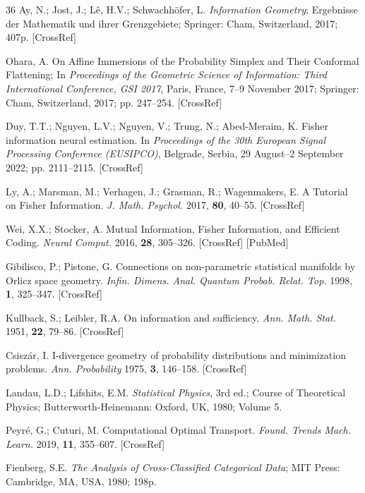 \documentclass[12pt]{article}
\begin{document}
\begin{thebibliography}{36}
Ay, N.; Jost, J.; L\^e, H.V.; Schwachhöfer, L. \textit{Information Geometry};
Ergebnisse der Mathematik und ihrer Grenzgebiete; Springer: Cham, Switzerland, 2017; 407p.
[CrossRef]

Ohara, A. On Affine Immersions of the Probability Simplex and Their Conformal Flattening;
In \textit{Proceedings of the Geometric Science of Information: Third International Conference, GSI 2017},
Paris, France, 7--9 November 2017; Springer: Cham, Switzerland, 2017; pp. 247--254. [CrossRef]

Duy, T.T.; Nguyen, L.V.; Nguyen, V.; Trung, N.; Abed-Meraim, K. Fisher information neural estimation.
In \textit{Proceedings of the 30th European Signal Processing Conference (EUSIPCO)},
Belgrade, Serbia, 29 August--2 September 2022; pp. 2111--2115. [CrossRef]

Ly, A.; Marsman, M.; Verhagen, J.; Grasman, R.; Wagenmakers, E. A Tutorial on Fisher Information.
\textit{J. Math. Psychol.} 2017, \textbf{80}, 40--55. [CrossRef]

Wei, X.X.; Stocker, A. Mutual Information, Fisher Information, and Efficient Coding.
\textit{Neural Comput.} 2016, \textbf{28}, 305--326. [CrossRef] [PubMed]

Gibilisco, P.; Pistone, G. Connections on non-parametric statistical manifolds by Orlicz space geometry.
\textit{Infin. Dimens. Anal. Quantum Probab. Relat. Top.} 1998, \textbf{1}, 325--347. [CrossRef]

Kullback, S.; Leibler, R.A. On information and sufficiency.
\textit{Ann. Math. Stat.} 1951, \textbf{22}, 79--86. [CrossRef]

Csiszár, I. I-divergence geometry of probability distributions and minimization problems.
\textit{Ann. Probability} 1975, \textbf{3}, 146--158. [CrossRef]

Landau, L.D.; Lifshits, E.M. \textit{Statistical Physics}, 3rd ed.; Course of Theoretical Physics;
Butterworth-Heinemann: Oxford, UK, 1980; Volume 5.

Peyré, G.; Cuturi, M. Computational Optimal Transport.
\textit{Found. Trends Mach. Learn.} 2019, \textbf{11}, 355--607. [CrossRef]

Fienberg, S.E. \textit{The Analysis of Cross-Classified Categorical Data};
MIT Press: Cambridge, MA, USA, 1980; 198p.


\end{thebibliography}
\end{document}
